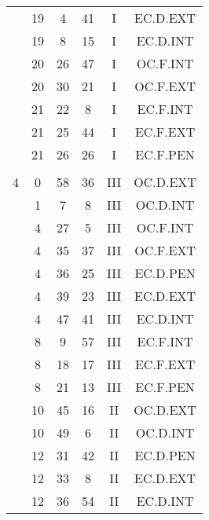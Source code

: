 \documentclass[12pt, a4paper]{article}
\begin{document}
\begin{multicols}{3}
{\begin{tabular}{c c c c c c}
	 	 	 	 & 19 & 4 & 41 & I & EC.D.EXT\\%
	 	 	 	 & 19 & 8 & 15 & I & EC.D.INT\\%
	 	 	 	 & 20 & 26 & 47 & I & OC.F.INT\\%
	 	 	 	 & 20 & 30 & 21 & I & OC.F.EXT\\%
	 	 	 	 & 21 & 22 & 8 & I & EC.F.INT\\%
	 	 	 	 & 21 & 25 & 44 & I & EC.F.EXT\\%
	 	 	 	 & 21 & 26 & 26 & I & EC.F.PEN\\%
	 	 	 	 & & & & & \\%
	 	 	 	4 & 0 & 58 & 36 & III & OC.D.EXT\\%
	 	 	 	 & 1 & 7 & 8 & III & OC.D.INT\\%
	 	 	 	 & 4 & 27 & 5 & III & OC.F.INT\\%
	 	 	 	 & 4 & 35 & 37 & III & OC.F.EXT\\%
	 	 	 	 & 4 & 36 & 25 & III & EC.D.PEN\\%
	 	 	 	 & 4 & 39 & 23 & III & EC.D.EXT\\%
	 	 	 	 & 4 & 47 & 41 & III & EC.D.INT\\%
	 	 	 	 & 8 & 9 & 57 & III & EC.F.INT\\%
	 	 	 	 & 8 & 18 & 17 & III & EC.F.EXT\\%
	 	 	 	 & 8 & 21 & 13 & III & EC.F.PEN\\%
	 	 	 	 & 10 & 45 & 16 & II & OC.D.EXT\\%
	 	 	 	 & 10 & 49 & 6 & II & OC.D.INT\\%
	 	 	 	 & 12 & 31 & 42 & II & EC.D.PEN\\%
	 	 	 	 & 12 & 33 & 8 & II & EC.D.EXT\\%
	 	 	 	 & 12 & 36 & 54 & II & EC.D.INT\\%

\end{tabular}}
\end{multicols}
\end{document}
